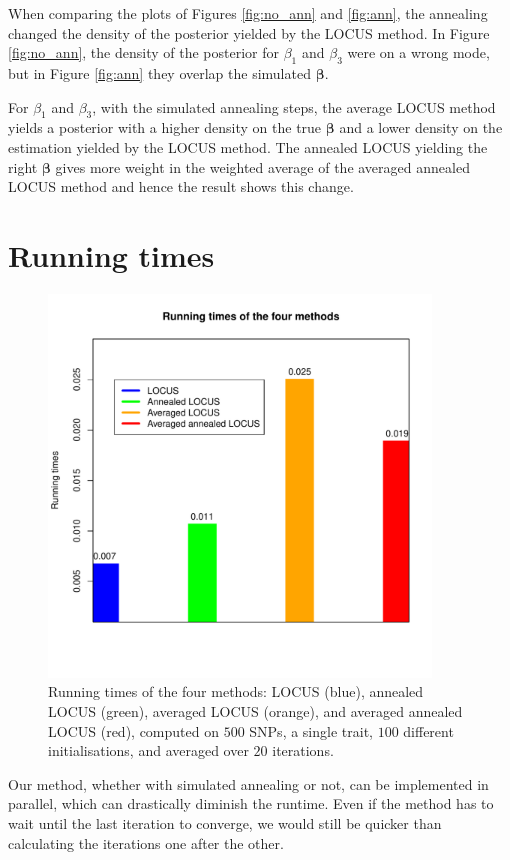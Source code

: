 \documentclass[a4paper, 11pt]{report}
\numberwithin{equation}{chapter}
\begin{document}
When comparing the plots of Figures \ref{fig:no_ann} and \ref{fig:ann}, the annealing changed the density of the posterior yielded by the LOCUS method. In Figure \ref{fig:no_ann}, the density of the posterior for $\beta_1$ and $\beta_3$ were on a wrong mode, but in Figure \ref{fig:ann} they overlap the simulated $\boldsymbol{\beta}$. 

For $\beta_1$ and $\beta_3$, with the simulated annealing steps, the average LOCUS method yields a posterior with a higher density on the true $\boldsymbol{\beta}$ and a lower density on the estimation yielded by the LOCUS method. The annealed LOCUS yielding the right $\boldsymbol{\beta}$ gives more weight in the weighted average of the averaged annealed LOCUS method and hence the result shows this change.
\section{Running times}
\begin{figure}
\centering
\includegraphics[width=4in,bb= 0 0 550 550]{images/runtimes.pdf}
\caption{\label{fig:runtime} Running times of the four methods: LOCUS (blue), annealed LOCUS (green), averaged LOCUS (orange), and averaged annealed LOCUS (red), computed on $500$ SNPs, a single trait, $100$ different initialisations, and averaged over $20$ iterations.}
\end{figure}

Our method, whether with simulated annealing or not, can be implemented in parallel, which can drastically diminish the runtime. Even if the method has to wait until the last iteration to converge, we would still be quicker than calculating the iterations one after the other.
\end{document}
